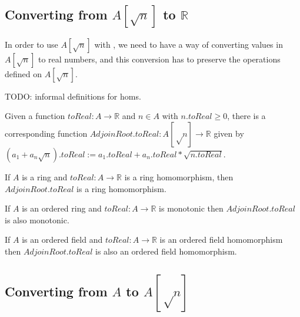 \subsection{Converting from $A[\sqrt{n}]$ to $ℝ$}

In order to use $A[\sqrt{n}]$ with , we need to have a way of
converting values in $A[\sqrt{n}]$ to real numbers, and this conversion has to preserve
the operations defined on $A[\sqrt{n}]$.

TODO: informal definitions for homs.


\begin{definition}
  \label{def:adjoinToReal}
  Given a function $toReal : A → ℝ$ and $n ∈ A$ with $n.toReal \geq 0$,
  there is a corresponding function $AdjoinRoot.toReal : A[√n] → ℝ$ given by
  $(a_1 + a_n\sqrt{n}).toReal := a_1.toReal + a_n.toReal * \sqrt{n.toReal}$.
\end{definition}

\begin{lemma}
  \label{thm:adjoinToRealRingHom}
  If $A$ is a ring and $toReal : A → ℝ$ is a ring homomorphism, then $AdjoinRoot.toReal$ is a ring
  homomorphism.
\end{lemma}

\begin{lemma}
  \label{thm:adjoinToRealOrderHom}
  If $A$ is an ordered ring and $toReal : A → ℝ$ is monotonic then $AdjoinRoot.toReal$ is also monotonic.
\end{lemma}


\begin{lemma}
  \label{thm:adjoinToRealOrderedFieldHom}
  If $A$ is an ordered field and $toReal : A → ℝ$ is an ordered field homomorphism
  then $AdjoinRoot.toReal$ is also an ordered field homomorphism.
\end{lemma}

\subsection{Converting from $A$ to $A[√n]$}

